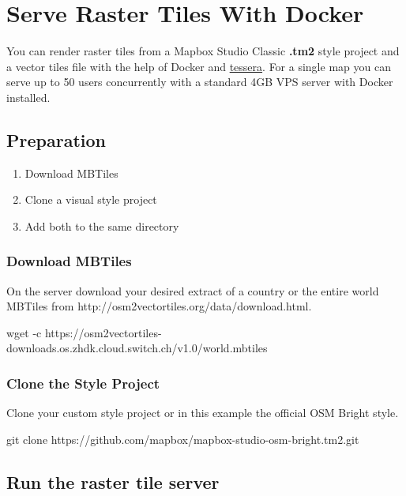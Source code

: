 {%
\section{Serve Raster Tiles With Docker}

You can render raster tiles from a Mapbox Studio Classic \textbf{.tm2}
style project and a vector tiles file with the help of Docker and
\href{https://github.com/mojodna/tessera}{tessera}. For a single map you
can serve up to 50 users concurrently with a standard 4GB VPS server
with Docker installed.

\subsection{Preparation}\label{preparation}

\begin{enumerate}
\item
  Download MBTiles
\item
  Clone a visual style project
\item
  Add both to the same directory
\end{enumerate}

\subsubsection{Download MBTiles}\label{download-mbtiles}

On the server download your desired extract of a country or the entire
world MBTiles from http://osm2vectortiles.org/data/download.html.

\begin{bashcode}
wget -c https://osm2vectortiles-downloads.os.zhdk.cloud.switch.ch/v1.0/world.mbtiles
\end{bashcode}

\subsubsection{Clone the Style Project}\label{clone-the-style-project}

Clone your custom style project or in this example the official OSM
Bright style.

\begin{bashcode}
git clone https://github.com/mapbox/mapbox-studio-osm-bright.tm2.git
\end{bashcode}

\subsection{Run the raster tile
server}\label{run-the-raster-tile-server}

}
